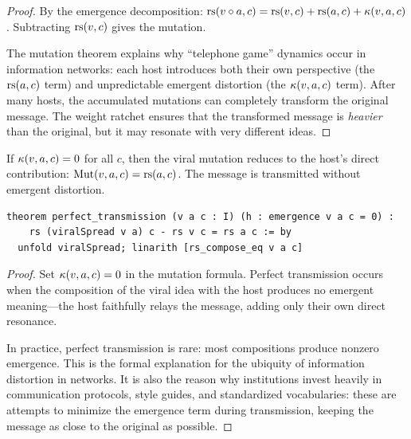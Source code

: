 \begin{proof}
By the emergence decomposition: $\mathrm{rs}(v \circ a, c) = \mathrm{rs}(v, c) + \mathrm{rs}(a, c)
+ \kappa(v, a, c)$.  Subtracting $\mathrm{rs}(v, c)$ gives the mutation.

The mutation theorem explains why ``telephone game'' dynamics occur in
information networks: each host introduces both their own perspective (the
$\mathrm{rs}(a, c)$ term) and unpredictable emergent distortion (the $\kappa(v, a, c)$
term).  After many hosts, the accumulated mutations can completely transform
the original message.  The weight ratchet ensures that the transformed message
is \emph{heavier} than the original, but it may resonate with very different
ideas.
\end{proof}

\begin{theorem}
\label{thm:perfect-transmission}
If $\kappa(v, a, c) = 0$ for all $c$, then the viral mutation reduces to
the host's direct contribution: $\text{Mut}(v, a, c) = \mathrm{rs}(a, c)$.  The
message is transmitted without emergent distortion.

\begin{lstlisting}[caption={Lean 4: Perfect transmission}]
theorem perfect_transmission (v a c : I) (h : emergence v a c = 0) :
    rs (viralSpread v a) c - rs v c = rs a c := by
  unfold viralSpread; linarith [rs_compose_eq v a c]
\end{lstlisting}
\end{theorem}

\begin{proof}
Set $\kappa(v, a, c) = 0$ in the mutation formula.  Perfect transmission
occurs when the composition of the viral idea with the host produces no
emergent meaning---the host faithfully relays the message, adding only their
own direct resonance.

In practice, perfect transmission is rare: most compositions produce nonzero
emergence.  This is the formal explanation for the ubiquity of information
distortion in networks.  It is also the reason why institutions invest
heavily in communication protocols, style guides, and standardized
vocabularies: these are attempts to minimize the emergence term during
transmission, keeping the message as close to the original as possible.
\end{proof}

